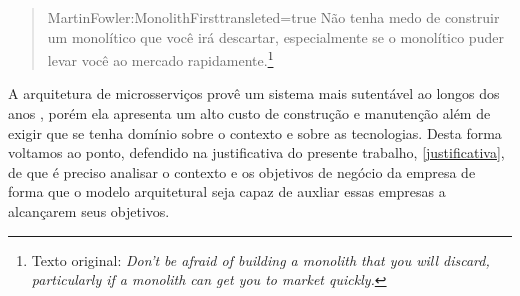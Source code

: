 \begin{quotation}{MartinFowler:MonolithFirst}{transleted=true}
    Não tenha medo de construir um monolítico que você irá descartar, especialmente se o monolítico
    puder levar você ao mercado rapidamente.\footnote{Texto original: \textit{ Don't be afraid of
    building a monolith that you will discard, particularly if a monolith can get you to market quickly.}}
\end{quotation}

A arquitetura de microsserviços provê um sistema mais sutentável ao longos dos anos
\cite{Guido2016:WhyMicroservices}, porém ela apresenta um alto custo de construção e
manutenção além de exigir que se tenha domínio sobre o contexto e sobre as tecnologias. Desta forma
voltamos ao ponto, defendido na justificativa do presente trabalho, \autoref{justificativa}, de que é preciso analisar o
contexto e os objetivos de negócio da empresa de forma que o modelo arquitetural seja capaz de
auxliar essas empresas a alcançarem seus objetivos.
